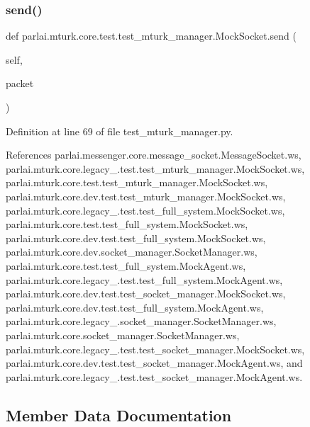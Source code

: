 \subsubsection{\texorpdfstring{send()}{send()}}
{\footnotesize\ttfamily def parlai.\+mturk.\+core.\+test.\+test\+\_\+mturk\+\_\+manager.\+Mock\+Socket.\+send (\begin{DoxyParamCaption}\item[{}]{self,  }\item[{}]{packet }\end{DoxyParamCaption})}



Definition at line 69 of file test\+\_\+mturk\+\_\+manager.\+py.



References parlai.\+messenger.\+core.\+message\+\_\+socket.\+Message\+Socket.\+ws, parlai.\+mturk.\+core.\+legacy\+\_.\+test.\+test\+\_\+mturk\+\_\+manager.\+Mock\+Socket.\+ws, parlai.\+mturk.\+core.\+test.\+test\+\_\+mturk\+\_\+manager.\+Mock\+Socket.\+ws, parlai.\+mturk.\+core.\+dev.\+test.\+test\+\_\+mturk\+\_\+manager.\+Mock\+Socket.\+ws, parlai.\+mturk.\+core.\+legacy\+\_.\+test.\+test\+\_\+full\+\_\+system.\+Mock\+Socket.\+ws, parlai.\+mturk.\+core.\+test.\+test\+\_\+full\+\_\+system.\+Mock\+Socket.\+ws, parlai.\+mturk.\+core.\+dev.\+test.\+test\+\_\+full\+\_\+system.\+Mock\+Socket.\+ws, parlai.\+mturk.\+core.\+dev.\+socket\+\_\+manager.\+Socket\+Manager.\+ws, parlai.\+mturk.\+core.\+test.\+test\+\_\+full\+\_\+system.\+Mock\+Agent.\+ws, parlai.\+mturk.\+core.\+legacy\+\_.\+test.\+test\+\_\+full\+\_\+system.\+Mock\+Agent.\+ws, parlai.\+mturk.\+core.\+dev.\+test.\+test\+\_\+socket\+\_\+manager.\+Mock\+Socket.\+ws, parlai.\+mturk.\+core.\+dev.\+test.\+test\+\_\+full\+\_\+system.\+Mock\+Agent.\+ws, parlai.\+mturk.\+core.\+legacy\+\_.\+socket\+\_\+manager.\+Socket\+Manager.\+ws, parlai.\+mturk.\+core.\+socket\+\_\+manager.\+Socket\+Manager.\+ws, parlai.\+mturk.\+core.\+legacy\+\_.\+test.\+test\+\_\+socket\+\_\+manager.\+Mock\+Socket.\+ws, parlai.\+mturk.\+core.\+dev.\+test.\+test\+\_\+socket\+\_\+manager.\+Mock\+Agent.\+ws, and parlai.\+mturk.\+core.\+legacy\+\_.\+test.\+test\+\_\+socket\+\_\+manager.\+Mock\+Agent.\+ws.



\subsection{Member Data Documentation}
\mbox{\label{classparlai_1_1mturk_1_1core_1_1test_1_1test__mturk__manager_1_1MockSocket_a7d23d7e646c285d2fbf728cd5a789b14}} 

